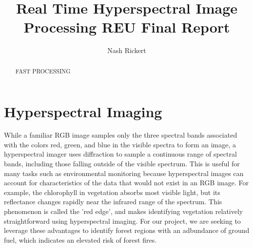 \documentclass[psamsfonts]{amsart}
\title{Real Time Hyperspectral Image Processing REU Final Report}
\author{Nash Rickert}
\theoremstyle{definition}
\theoremstyle{remark}
\numberwithin{equation}{section}
\begin{document}
\begin{abstract}

    FAST PROCESSING


\end{abstract}

\maketitle

\tableofcontents

\section{Hyperspectral Imaging}
While a familiar RGB image samples only the three spectral bands associated with the colors red, green, and blue in the visible spectra to form an image, a hyperspectral imager uses diffraction to sample a continuous range of spectral bands, including those falling outside of the visible spectrum. This is useful for many tasks such as environmental monitoring because hyperspectral images can account for characteristics of the data that would not exist in an RGB image. For example, the chlorophyll in vegetation absorbs most visible light, but its reflectance changes rapidly near the infrared range of the spectrum. This phenomenon is called the 'red edge', and makes identifying vegetation relatively straightforward using hyperspectral imaging. For our project, we are seeking to leverage these advantages to identify forest regions with an adbundance of ground fuel, which indicates an elevated risk of forest fires.
\end{document}
